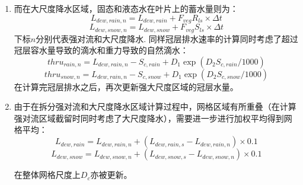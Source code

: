 \begin{enumerate}
\item 而在大尺度降水区域，固态和液态水在叶片上的蓄水量则为：
\begin{equation}
L_{dew,rain,n}=L_{dew,rain}+F_{veg}R_{ls}\times \Delta{t}
\end{equation}
\begin{equation}
L_{dew,snow,n}=L_{dew,snow}+F_{veg}S_{ls} \times \Delta{t}
\end{equation}
下标$n$分别代表强对流和大尺度降水.
同样冠层排水速率的计算同时考虑了超过冠层容水量导致的滴水和重力导致的自然滴水：
\begin{equation}
thru_{rain,n}=L_{dew,rain,n}-S_{c,rain}+D_{1} \exp \left(D_{2} S_{c,rain}/1000\right)
\end{equation}
\begin{equation}
thru_{snow,n}=L_{dew,rain,n}-S_{c,snow}+D_{1} \exp \left(D_{2} S_{c,snow}/1000\right)
\end{equation}
在计算完冠层排水之后，再次更新强大尺度区域的冠层水量。
\item 由于在拆分强对流和大尺度降水区域计算过程中，网格区域有所重叠（在计算强对流区域截留时同时考虑了大尺度降水），需要进一步进行加权平均得到网格平均：
\begin{equation}
L_{dew,rain}=L_{dew,rain,n}+(L_{dew,rain,s}-L_{dew,rain,n}) \times 0.1
\end{equation}
\begin{equation}
L_{dew,snow}=L_{dew,snow,n}+(L_{dew,snow,s}-L_{dew,snow,n}) \times 0.1
\end{equation}

在整体网格尺度上$D_c$亦被更新。

\end{enumerate}

